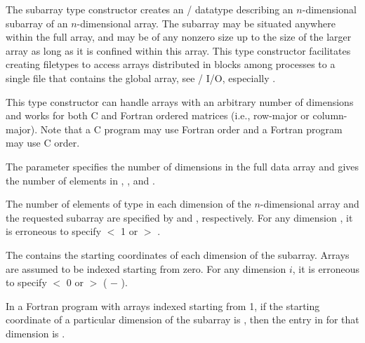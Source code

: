 
The subarray type constructor creates an \MPI/ datatype
describing an
$n$-dimensional
subarray of an
$n$-dimensional
array.
The subarray may be situated anywhere within the full array,
and may be of any nonzero size up to the size of the larger array
as long as it is confined within this array.
This type constructor facilitates creating filetypes to access
arrays distributed in blocks among processes to a
single file that contains the global array,
see \MPI/ I/O, especially .

This type constructor can handle arrays with an arbitrary number of
dimensions and works for both C and Fortran ordered matrices
(i.e., row-major or column-major).  Note that a C program may use Fortran
order and a Fortran program may use C order.


The  parameter specifies the number of dimensions in the full
data array and gives the number of elements in
, ,
and .

The number of elements of type  in
each dimension of the
$n$-dimensional
array and the
requested subarray are specified by
 and ,
respectively.
For any dimension
,
it is erroneous to specify
 $<$ 1 or
 $>$ .

The  contains the
starting coordinates of each
dimension of the subarray.
Arrays are assumed to be indexed starting from zero.
For any dimension $i$, it is erroneous to specify
 $<$ 0 or
$>$ ( $-$ ).

\begin{users}
In a Fortran program with arrays indexed starting from 1,
if the starting coordinate of a particular dimension
of the subarray is ,
then the entry in 
for that dimension is .
\end{users}


